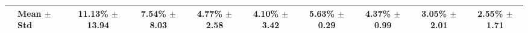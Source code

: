 \begin{table}[t]
{\begin{tabular}{ll*{8}{c}}
\midrule
 & \textbf{Mean $\pm$ Std} & 11.13\% $\pm$ 13.94 & 7.54\% $\pm$ 8.03 & 4.77\% $\pm$ 2.58 & 4.10\% $\pm$ 3.42 & 5.63\% $\pm$ 0.29 & 4.37\% $\pm$ 0.99 & 3.05\% $\pm$ 2.01 & 2.55\% $\pm$ 1.71 \\
\bottomrule
\end{tabular}
}
\end{table}
